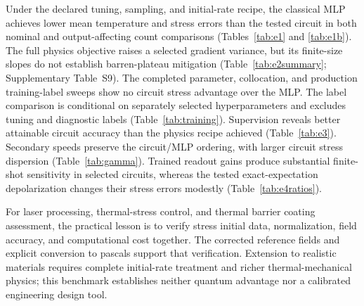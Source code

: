 \documentclass[11pt]{article}
\begin{document}
Under the declared tuning, sampling, and initial-rate recipe, the classical
MLP achieves lower mean temperature and stress errors than the tested
circuit in both nominal and output-affecting count comparisons
(Tables~\ref{tab:e1} and \ref{tab:e1b}). The full physics objective raises
a selected gradient variance, but its finite-size slopes do not establish
barren-plateau mitigation (Table~\ref{tab:e2summary}; Supplementary Table~S9).
The completed parameter, collocation, and production training-label
sweeps show no circuit stress advantage over the MLP. The label comparison
is conditional on separately selected hyperparameters and excludes tuning
and diagnostic labels (Table~\ref{tab:training}). Supervision reveals better attainable circuit accuracy
than the physics recipe achieved (Table~\ref{tab:e3}). Secondary speeds
preserve the circuit/MLP ordering, with larger circuit stress dispersion
(Table~\ref{tab:gamma}). Trained readout gains
produce substantial finite-shot sensitivity in selected circuits, whereas
the tested exact-expectation depolarization changes their stress errors
modestly (Table~\ref{tab:e4ratios}).

For laser processing, thermal-stress control, and thermal barrier coating
assessment, the practical lesson is to verify stress initial data,
normalization, field accuracy, and computational cost together. The
corrected reference fields and explicit conversion to pascals support
that verification. Extension to realistic materials requires complete
initial-rate treatment and richer thermal-mechanical physics; this
benchmark establishes neither quantum advantage nor a calibrated
engineering design tool.

\end{document}
